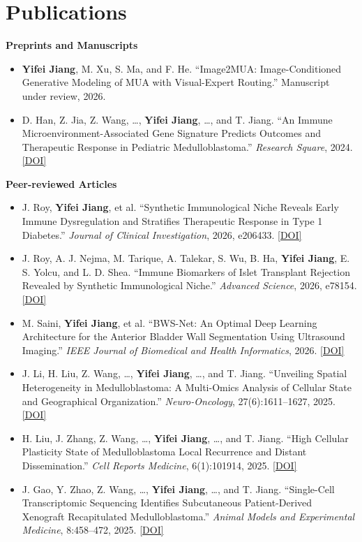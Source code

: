 \documentclass{chicv}
\begin{document}
\section{Publications}
\vspace{3pt}
\textbf{Preprints and Manuscripts}
\begin{itemize}
  \item \textbf{Yifei Jiang}, M. Xu, S. Ma, and F. He. ``Image2MUA: Image-Conditioned
    Generative Modeling of MUA with Visual-Expert Routing.'' Manuscript under review, 2026.
  \item D. Han, Z. Jia, Z. Wang, \ldots, \textbf{Yifei Jiang}, \ldots, and T. Jiang.
    ``An Immune Microenvironment-Associated Gene Signature Predicts Outcomes and Therapeutic
    Response in Pediatric Medulloblastoma.'' \textit{Research Square}, 2024.
    \href{https://doi.org/10.21203/rs.3.rs-2723037/v3}{[DOI]}
\end{itemize}

\textbf{Peer-reviewed Articles}
\begin{itemize}
  \item J. Roy, \textbf{Yifei Jiang}, et al. ``Synthetic Immunological Niche Reveals Early
    Immune Dysregulation and Stratifies Therapeutic Response in Type 1 Diabetes.''
    \textit{Journal of Clinical Investigation}, 2026, e206433.
    \href{https://doi.org/10.1172/JCI206433}{[DOI]}
  \item J. Roy, A. J. Nejma, M. Tarique, A. Talekar, S. Wu, B. Ha, \textbf{Yifei Jiang},
    E. S. Yolcu, and L. D. Shea. ``Immune Biomarkers of Islet Transplant Rejection Revealed by
    Synthetic Immunological Niche.'' \textit{Advanced Science}, 2026, e78154.
    \href{https://doi.org/10.1002/advs.78154}{[DOI]}
  \item M. Saini, \textbf{Yifei Jiang}, et al. ``BWS-Net: An Optimal Deep Learning Architecture
    for the Anterior Bladder Wall Segmentation Using Ultrasound Imaging.''
    \textit{IEEE Journal of Biomedical and Health Informatics}, 2026.
    \href{https://doi.org/10.1109/JBHI.2026.3675965}{[DOI]}
  \item J. Li, H. Liu, Z. Wang, \ldots, \textbf{Yifei Jiang}, \ldots, and T. Jiang.
    ``Unveiling Spatial Heterogeneity in Medulloblastoma: A Multi-Omics Analysis of Cellular State
    and Geographical Organization.'' \textit{Neuro-Oncology}, 27(6):1611--1627, 2025.
    \href{https://doi.org/10.1093/neuonc/noaf020}{[DOI]}
  \item H. Liu, J. Zhang, Z. Wang, \ldots, \textbf{Yifei Jiang}, \ldots, and T. Jiang.
    ``High Cellular Plasticity State of Medulloblastoma Local Recurrence and Distant Dissemination.''
    \textit{Cell Reports Medicine}, 6(1):101914, 2025.
    \href{https://doi.org/10.1016/j.xcrm.2024.101914}{[DOI]}
  \item J. Gao, Y. Zhao, Z. Wang, \ldots, \textbf{Yifei Jiang}, \ldots, and T. Jiang.
    ``Single-Cell Transcriptomic Sequencing Identifies Subcutaneous Patient-Derived Xenograft
    Recapitulated Medulloblastoma.'' \textit{Animal Models and Experimental Medicine}, 8:458--472,
    2025.
    \href{https://doi.org/10.1002/ame2.12399}{[DOI]}
\end{itemize}
\end{document}
